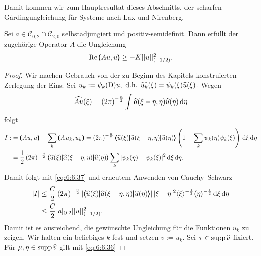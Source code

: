 Damit kommen wir zum Hauptresultat dieses Abschnitts, der scharfen G\r{a}rdingungleichung für Systeme nach Lax und Nirenberg.

\begin{thm}
Sei $a\in\mathcal{C}_{0,2}\cap\mathcal{C}_{2,0}$ selbstadjungiert und positiv-semidefinit. Dann erfüllt der zugehörige Operator $A$ die Ungleichung
\begin{equation}
	\operatorname{Re} \pmb(Au,u\pmb) \ge - K|| u||_{\left(-{1}/{2}\right)}^2.
\end{equation}
\end{thm}
\begin{proof}
	Wir machen Gebrauch von der zu Beginn des Kapitels konstruierten Zerlegung der Eins: Sei $	u_k:= \psi_k(\mathrm D)u, \text{ d.h. } \widehat{u_k}(\xi) = \psi_k(\xi) \widehat{u}(\xi).$ Wegen 
\begin{equation}
	\widehat{Au}(\xi) = \left(2\pi\right)^{-\frac{n}{2}}\int \widehat{a}(\xi-\eta,\eta)\widehat{u}(\eta)\,\mathrm d \eta
\end{equation}	 
folgt
\begin{equation}
\begin{split} I:&=\pmb(Au,u\pmb)-\sum\limits_k \pmb(Au_k,u_k\pmb) = \left(2\pi\right)^{-\frac{n}{2}}\relax \pmb\langle\widehat{u}(\xi)\pmb|\widehat{a}(\xi-\eta,\eta)\pmb|\widehat{u}(\eta)\pmb\rangle\left(1-\sum\limits_k \psi_k(\eta)\psi_k(\xi)\right)\,\mathrm d \xi\,\mathrm d\eta\notag\\
	&= \frac{1}{2}\left(2\pi\right)^{-\frac{n}{2}} \relax \pmb\langle\widehat{u}(\xi)\pmb|\widehat{a}(\xi-\eta,\eta)\pmb|\widehat{u}(\eta)\pmb\rangle\sum\limits_k\vert\psi_k(\eta)-\psi_k(\xi)\vert^2\,\mathrm d \xi\,\mathrm d\eta.
\end{split}
\end{equation}
Damit folgt mit \eqref{eq:6:6.37} und erneutem Anwenden von Cauchy--Schwarz
\begin{equation}
\begin{split}	
| I| &\le \frac{C}{2}\left(2\pi\right)^{-\frac{n}{2}}\relax| \pmb\langle\widehat{u}(\xi)\pmb|\widehat{a}(\xi-\eta,\eta)\pmb|\widehat{u}(\eta)\pmb\rangle| \, |\xi-\eta|^2\langle \xi\rangle^{-\frac{1}{2}} \langle\eta\rangle^{-\frac{1}{2}}\,\mathrm d \xi \,\mathrm d \eta\\ 
& \le \frac{C}{2}| a|_{0,2}|| u||_{(-{1}/{2})}^2.
\end{split}
\end{equation}
Damit ist es ausreichend, die gewünschte Ungleichung für die Funktionen $u_k$ zu zeigen. Wir halten ein beliebiges $k$ fest und setzen $v:= u_k.$ Sei $\tau\in \operatorname{supp} \widehat{v}$ fixiert. Für $\mu, \eta \in \operatorname{supp} \widehat{v}$ gilt mit \eqref{eq:6:6.36}

\end{proof}
